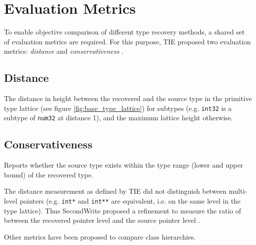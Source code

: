
\section{Evaluation Metrics}



To enable objective comparison of different type recovery methods, a shared set of evaluation metrics are required. For this purpose, TIE proposed two evaluation metrics: \textit{distance} and \textit{conservativeness} \cite{tie_reverse_engineering_of_types}.


\subsection{Distance}

The distance in height between the recovered and the source type in the primitive type lattice (see figure \ref{fig:base_type_lattice}) for subtypes (e.g. \texttt{int32} is a subtype of \texttt{num32} at distance 1), and the maximum lattice height otherwise.


\subsection{Conservativeness}

Reports whether the source type exists within the type range (lower and upper bound) of the recovered type.

The distance measurement as defined by TIE did not distinguish between multi-level pointers (e.g. \texttt{int*} and \texttt{int**} are equivalent, i.e. on the same level in the type lattice). Thus SecondWrite proposed a refinement to measure the ratio of between the recovered pointer level and the source pointer level \cite{second_write_scalable_type_detection}.

Other metrics have been proposed to compare class hierarchies.
